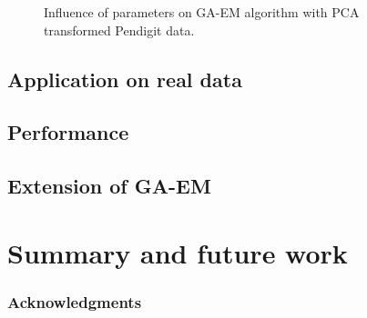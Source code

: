 \documentclass{article} %
\begin{document}
\begin{figure}[h]
\begin{center}
\end{center}
\caption{Influence of parameters on GA-EM algorithm with PCA transformed Pendigit data.}
\label{fig:mod_sel_penpca}
\end{figure}
 
\subsection{Application on real data}

\subsection{Performance}

\subsection{Extension of GA-EM}


\section{Summary and future work}




\subsubsection*{Acknowledgments}
\end{document}
